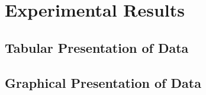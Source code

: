 
\chapter{Experimental Results} %

\label{Results} %


\section{Tabular Presentation of Data}


\section{Graphical Presentation of Data}
